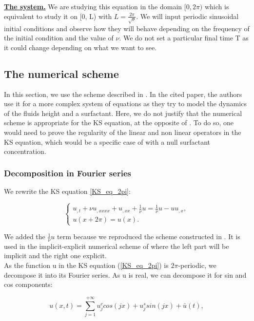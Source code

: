 \documentclass[12pt]{article}
\begin{document}
\underline{\textbf{The system.}} We are studying this equation in the domain $[0, 2\pi)$ which is equivalent to study it on [0, L) with $L=\frac{2\pi}{\sqrt{\nu}}$. 
We will input periodic sinusoidal initial conditions and observe how they will behave depending on the frequency of the initial condition and the value of $\nu$. We 
do not set a particular final time T as it could change depending on what we want to see.


\subsection{The numerical scheme}
In this section, we use the scheme described in \cite{Scheme_for_KS}. In the cited paper, the authors use it for a more complex system of equations as they try to 
model the dynamics of the fluids height and a surfactant. Here, we do not justify that the numerical scheme is appropriate for the KS equation, at the opposite 
of \cite{Scheme_for_KS} .
To do so, one would need to prove the regularity of the linear and non linear operators in the KS equation, which would be a specific case of \cite{Scheme_for_KS} with a null surfactant concentration.

\subsubsection{Decomposition in Fourier series}
We rewrite the KS equation \eqref{KS_eq_2pi}: 

\begin{equation}\label{KS_eq_2pi_1/nu}
\left\{
\begin{aligned}
    u_{,t}  + \nu u_{,xxxx} + u_{,xx} + \frac{1}{\nu}u=\frac{1}{\nu}u -uu_{,x},  \\
    u(x+2\pi)=u(x). 
\end{aligned}
\right.
\end{equation}

We added the $\frac{1}{\nu}u$ term because we reproduced the scheme constructed in \cite{Scheme_for_KS}. It is used in the implicit-explicit numerical scheme of \cite{KS_scheme_C_A} where the left part will be implicit and the right one explicit.
\\

As the function u in the KS equation (\ref{KS_eq_2pi}) is $2\pi$-periodic, we decompose it into its Fourier series. As u is real, we can 
decompose it for sin and cos components:

\begin{equation}\label{u_Fourier_serie}
    u(x, t) = \sum_{j=1}^{+\infty} u_j^ccos(jx) + u_j^ssin(jx) + \bar{u}(t),
\end{equation}
\end{document}
